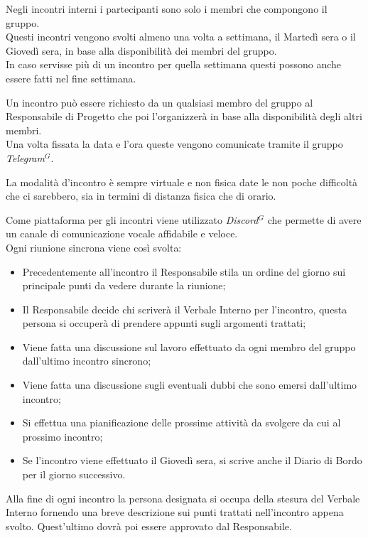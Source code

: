             Negli incontri interni i partecipanti sono solo i membri che compongono il gruppo. \\
            Questi incontri vengono svolti almeno una volta a settimana, il Martedì sera o il Giovedì sera, in base alla disponibilità dei membri del gruppo. \\
            In caso servisse più di un incontro per quella settimana questi possono anche essere fatti nel fine settimana.

            Un incontro può essere richiesto da un qualsiasi membro del gruppo al Responsabile di Progetto che poi l'organizzerà in base alla disponibilità degli altri membri. \\
            Una volta fissata la data e l'ora queste vengono comunicate tramite il gruppo \emph{Telegram}$^{G}$.

            La modalità d'incontro è sempre virtuale e non fisica date le non poche difficoltà che ci sarebbero, sia in termini di distanza fisica che di orario.

            Come piattaforma per gli incontri viene utilizzato \emph{Discord}$^{G}$ che permette di avere un canale di comunicazione vocale affidabile e veloce.\\

            Ogni riunione sincrona viene così svolta:
            \begin{itemize}
                \item Precedentemente all'incontro il Responsabile stila un ordine del giorno sui principale punti da vedere durante la riunione;
                \item Il Responsabile decide chi scriverà il Verbale Interno per l'incontro, questa persona si occuperà di prendere appunti sugli argomenti trattati;
                \item Viene fatta una discussione sul lavoro effettuato da ogni membro del gruppo dall'ultimo incontro sincrono;
                \item Viene fatta una discussione sugli eventuali dubbi che sono emersi dall'ultimo incontro;
                \item Si effettua una pianificazione delle prossime attività da svolgere da cui al prossimo incontro;
                \item Se l'incontro viene effettuato il Giovedì sera, si scrive anche il Diario di Bordo per il giorno successivo.
            \end{itemize}

            Alla fine di ogni incontro la persona designata si occupa della stesura del Verbale Interno fornendo una breve descrizione sui punti trattati nell'incontro appena svolto.
            Quest'ultimo dovrà poi essere approvato dal Responsabile.


